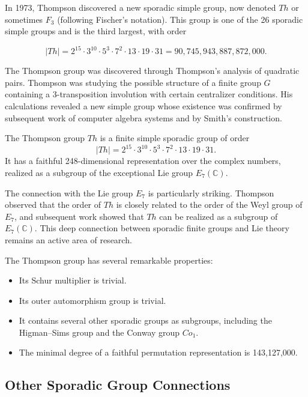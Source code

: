 In 1973, Thompson discovered a new sporadic simple group, now denoted \(Th\) or sometimes \(F_3\) (following Fischer's notation). This group is one of the 26 sporadic simple groups and is the third largest, with order

\[
|Th| = 2^{15} \cdot 3^{10} \cdot 5^3 \cdot 7^2 \cdot 13 \cdot 19 \cdot 31 = 90,745,943,887,872,000.
\]

The Thompson group was discovered through Thompson's analysis of quadratic pairs. Thompson was studying the possible structure of a finite group \(G\) containing a 3-transposition involution with certain centralizer conditions. His calculations revealed a new simple group whose existence was confirmed by subsequent work of computer algebra systems and by Smith's construction.

\begin{definition}
The Thompson group \(Th\) is a finite simple sporadic group of order
\[
|Th| = 2^{15} \cdot 3^{10} \cdot 5^3 \cdot 7^2 \cdot 13 \cdot 19 \cdot 31.
\]
It has a faithful 248-dimensional representation over the complex numbers, realized as a subgroup of the exceptional Lie group \(E_7(\mathbb{C})\).
\end{definition}

The connection with the Lie group \(E_7\) is particularly striking. Thompson observed that the order of \(Th\) is closely related to the order of the Weyl group of \(E_7\), and subsequent work showed that \(Th\) can be realized as a subgroup of \(E_7(\mathbb{C})\). This deep connection between sporadic finite groups and Lie theory remains an active area of research.

The Thompson group has several remarkable properties:
\begin{itemize}
\item Its Schur multiplier is trivial.
\item Its outer automorphism group is trivial.
\item It contains several other sporadic groups as subgroups, including the Higman--Sims group and the Conway group \(Co_1\).
\item The minimal degree of a faithful permutation representation is 143,127,000.
\end{itemize}

\subsection{Other Sporadic Group Connections}

